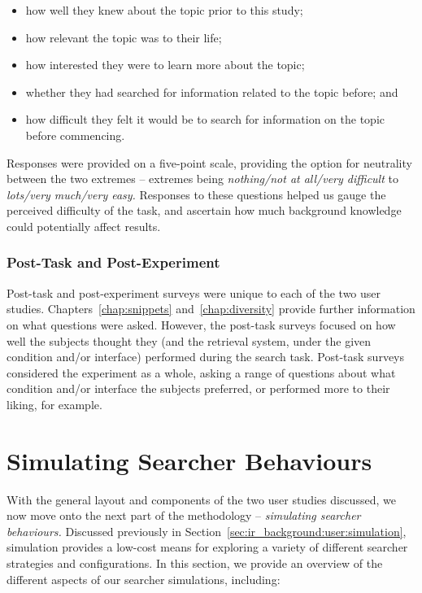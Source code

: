 \begin{itemize}
    \item{how well they knew about the topic prior to this study;}
    \item{how relevant the topic was to their life;}
    \item{how interested they were to learn more about the topic;}
    \item{whether they had searched for information related to the topic before; and}
    \item{how difficult they felt it would be to search for information on the topic before commencing.}
\end{itemize}

Responses were provided on a five-point scale, providing the option for neutrality between the two extremes -- extremes being \emph{nothing/not at all/very difficult} to \emph{lots/very much/very easy.} Responses to these questions helped us gauge the perceived difficulty of the task, and ascertain how much background knowledge could potentially affect results.

\subsubsection{Post-Task and Post-Experiment}
Post-task and post-experiment surveys were unique to each of the two user studies. Chapters~\ref{chap:snippets} and~\ref{chap:diversity} provide further information on what questions were asked. However, the post-task surveys focused on how well the subjects thought they (and the retrieval system, under the given condition and/or interface) performed during the search task. Post-task surveys considered the experiment as a whole, asking a range of questions about what condition and/or interface the subjects preferred, or performed more to their liking, for example.

\section{Simulating Searcher Behaviours}\label{chap:csm:method:simulation}
With the general layout and components of the two user studies discussed, we now move onto the next part of the methodology -- \emph{simulating searcher behaviours.} Discussed previously in Section~\ref{sec:ir_background:user:simulation}, simulation provides a low-cost means for exploring a variety of different searcher strategies and configurations. In this section, we provide an overview of the different aspects of our searcher simulations, including:

